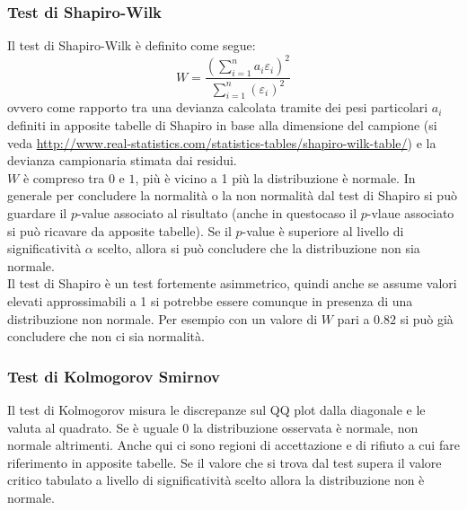 \subsubsection{Test di Shapiro-Wilk}
Il test di Shapiro-Wilk è definito come segue:
\begin{equation}
W = \frac{(\sum_{i=1}^{n} a_i \varepsilon_i)^2}{\sum_{i=1}^{n} (\varepsilon_i)^2}
\end{equation}
ovvero come rapporto tra una devianza calcolata tramite dei pesi particolari $a_i$ definiti in apposite tabelle di Shapiro in base alla dimensione del campione (si veda \url{http://www.real-statistics.com/statistics-tables/shapiro-wilk-table/}) e la devianza campionaria stimata dai residui.\\
$W$ è compreso tra $0$ e $1$, più è vicino a 1 più la distribuzione è normale. In generale per concludere la normalità o la non normalità dal test di Shapiro si può guardare il $p$-value associato al risultato (anche in questocaso il $p$-vlaue associato si può ricavare da apposite tabelle). Se il $p$-value è superiore al livello di significatività $\alpha$ scelto, allora si può concludere che la distribuzione non sia normale.\\
Il test di Shapiro è un test fortemente asimmetrico, quindi anche se assume valori elevati approssimabili a 1 si potrebbe essere comunque in presenza di una distribuzione non normale. Per esempio con un valore di $W$ pari a $0.82$ si può già concludere che non ci sia normalità.

\subsubsection{Test di Kolmogorov Smirnov}
Il test di Kolmogorov misura le discrepanze sul QQ plot dalla diagonale e le valuta al quadrato. Se è uguale 0 la distribuzione osservata è normale, non normale altrimenti. Anche qui ci sono regioni di accettazione e di rifiuto a cui fare riferimento in apposite tabelle. Se il valore che si trova dal test supera il valore critico tabulato a livello di significatività scelto allora la distribuzione non è normale.


